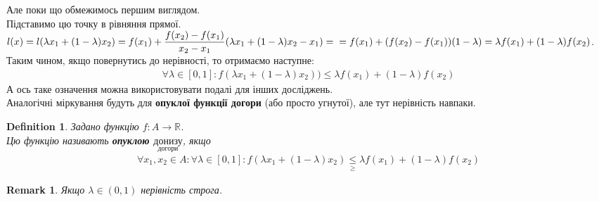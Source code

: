 \documentclass[a4paper, 14pt]{article}
\theoremstyle{theoremdd}
\theoremstyle{theoremdd}
\newtheorem{definition}[theorem]{Definition}
\theoremstyle{theoremdd}
\theoremstyle{theoremdd}
\theoremstyle{theoremdd}
\theoremstyle{theoremdd}
\newtheorem{remark}[theorem]{Remark}
\theoremstyle{theoremdd}
\theoremstyle{theoremdd}
\begin{document}
Але поки що обмежимось першим виглядом.\\
Підставимо цю точку в рівняння прямої.\\
$l(x) = l(\lambda x_1 + (1-\lambda) x_2) = f(x_1) + \dfrac{f(x_2)-f(x_1)}{x_2-x_1} (\lambda x_1 + (1-\lambda)x_2 - x_1) = \\
= f(x_1) + (f(x_2)-f(x_1))(1-\lambda) = \lambda f(x_1) + (1-\lambda)f(x_2)$.\\
Таким чином, якщо повернутись до нерівності, то отримаємо наступне:
\begin{align*}
\forall \lambda \in [0,1]: f(\lambda x_1 + (1-\lambda)x_2)) \leq \lambda f(x_1) + (1-\lambda) f(x_2)
\end{align*}
А ось таке означення можна використовувати подалі для інших досліджень.\\
Аналогічні міркування будуть для \textbf{опуклої функції догори} (або просто угнутої), але тут нерівність навпаки.

\begin{definition}
Задано функцію $f: A \to \mathbb{R}$.\\
Цю функцію називають \textbf{опуклою $\underset{\textrm{догори}}{\textrm{донизу}}$}, якщо
\begin{align*}
\forall x_1,x_2 \in A: \forall \lambda \in [0,1]: f(\lambda x_1 + (1-\lambda)x_2) \underset{\geq}{\leq} \lambda f(x_1) + (1-\lambda)f(x_2)
\end{align*}
\end{definition}

\begin{remark}
Якщо $\lambda \in (0,1)$ нерівність строга.
\end{remark}
\end{document}
